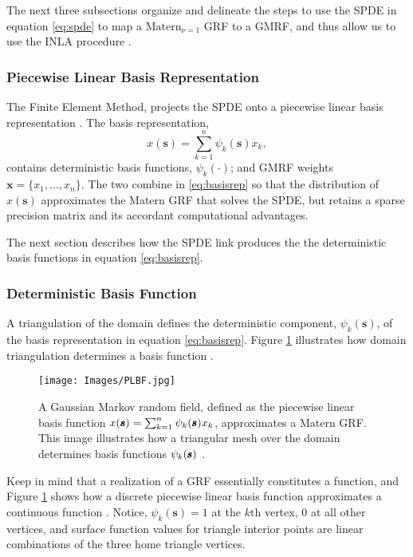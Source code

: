 The next three subsections organize and delineate the steps to use the SPDE in equation \ref{eq:spde} to map a $\text{Matern}_{\nu = 1}$ GRF to a GMRF, and thus allow us to use the INLA procedure \citep{Lindgren2011}.

\subsubsection{Piecewise Linear Basis Representation}
The Finite Element Method, projects the SPDE onto a piecewise linear basis representation \citep{Simpson2012}. The basis representation,
\begin{equation} \label{eq:basisrep}
x(\pmb{s}) = \sum_{k=1}^{n} \psi_{k}(\pmb{s})x_{k},
\end{equation}
contains deterministic basis functions, $\psi_{k}(\cdot)$; and GMRF weights $\pmb{x} = \{x_{1},\dots,x_{n}\}$. The two combine in \ref{eq:basisrep} so that the distribution of $x(\pmb{s})$ approximates the Matern GRF that solves the SPDE, but retains a sparse precision matrix and its accordant computational advantages. 

The next section describes how the SPDE link produces the the deterministic basis functions in equation \ref{eq:basisrep}.

\subsubsection{Deterministic Basis Function}

A triangulation of the domain defines the deterministic component, $\psi_{k}(\pmb{s})$, of the basis representation in equation \ref{eq:basisrep}. Figure \ref{fig:basis} illustrates how domain triangulation determines a basis function \citep{Simpson2012}.
  \begin{figure}[H]
	\centering 
	\texttt{[image: Images/PLBF.jpg]}
	\caption{A Gaussian Markov random field, defined as the piecewise linear basis function $  x(\pmb{s}) = \sum_{k=1}^{n} \protect\psi_{k}(\pmb{s})x_{k}$, approximates a Matern GRF. This image illustrates how a triangular mesh over the domain determines basis functions $\protect\psi_{k}(\pmb{s})$ 
	\citep{Simpson2012}.}
	\label{fig:basis}
	\end{figure}
Keep in mind that a realization of a GRF essentially constitutes a function, and Figure \ref{fig:basis} shows how a discrete piecewise linear basis function approximates a continuous function \citep{Simpson2012}. Notice, $\psi_{k}(\pmb{s}) = 1$ at the $k\text{th}$ vertex, $0$ at all other vertices, and surface function values for triangle interior points are linear combinations of the three home triangle vertices.
 
